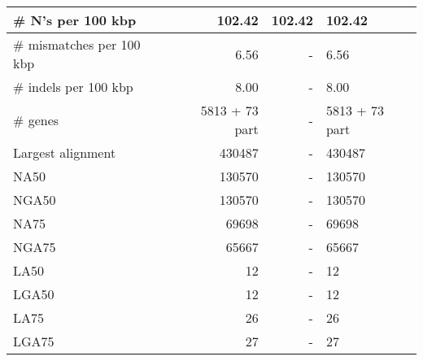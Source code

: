 \documentclass[12pt,a4paper]{article}
\begin{document}
\begin{table}[ht]
\begin{center}
\begin{tabular}{|l*{2}{|r}|}
\# N's per 100 kbp & 102.42 & 102.42 & 102.42 \\ \hline
\# mismatches per 100 kbp & 6.56 & - & 6.56 \\ \hline
\# indels per 100 kbp & 8.00 & - & 8.00 \\ \hline
\# genes & 5813 + 73 part & - & 5813 + 73 part \\ \hline
Largest alignment & 430487 & - & 430487 \\ \hline
NA50 & 130570 & - & 130570 \\ \hline
NGA50 & 130570 & - & 130570 \\ \hline
NA75 & 69698 & - & 69698 \\ \hline
NGA75 & 65667 & - & 65667 \\ \hline
LA50 & 12 & - & 12 \\ \hline
LGA50 & 12 & - & 12 \\ \hline
LA75 & 26 & - & 26 \\ \hline
LGA75 & 27 & - & 27 \\ \hline
\end{tabular}
\end{center}
\end{table}
\end{document}
